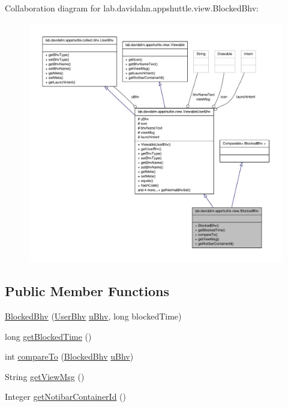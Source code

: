 \-Collaboration diagram for lab.\-davidahn.\-appshuttle.\-view.\-Blocked\-Bhv\-:
\nopagebreak
\begin{figure}[H]
\begin{center}
\leavevmode
\includegraphics[width=350pt]{classlab_1_1davidahn_1_1appshuttle_1_1view_1_1_blocked_bhv__coll__graph}
\end{center}
\end{figure}
\subsection*{\-Public \-Member \-Functions}
\begin{DoxyCompactItemize}
\item 
\hyperlink{classlab_1_1davidahn_1_1appshuttle_1_1view_1_1_blocked_bhv_a21ecdacd2cc6d1083c4d2a0d947bc168}{\-Blocked\-Bhv} (\hyperlink{interfacelab_1_1davidahn_1_1appshuttle_1_1collect_1_1bhv_1_1_user_bhv}{\-User\-Bhv} \hyperlink{classlab_1_1davidahn_1_1appshuttle_1_1view_1_1_viewable_user_bhv_a562684126a3e756e8ebe246c89699ba9}{u\-Bhv}, long blocked\-Time)
\item 
long \hyperlink{classlab_1_1davidahn_1_1appshuttle_1_1view_1_1_blocked_bhv_a5a9ea12146206e1c710c739fad13d0b4}{get\-Blocked\-Time} ()
\item 
int \hyperlink{classlab_1_1davidahn_1_1appshuttle_1_1view_1_1_blocked_bhv_ab536968dce0d07e05aeda0eb1b60dab4}{compare\-To} (\hyperlink{classlab_1_1davidahn_1_1appshuttle_1_1view_1_1_blocked_bhv}{\-Blocked\-Bhv} \hyperlink{classlab_1_1davidahn_1_1appshuttle_1_1view_1_1_viewable_user_bhv_a562684126a3e756e8ebe246c89699ba9}{u\-Bhv})
\item 
\-String \hyperlink{classlab_1_1davidahn_1_1appshuttle_1_1view_1_1_blocked_bhv_a0d026a69132e28284ed9282566236d03}{get\-View\-Msg} ()
\item 
\-Integer \hyperlink{classlab_1_1davidahn_1_1appshuttle_1_1view_1_1_blocked_bhv_af93e46e176446f7a1bbb6fdc1f867fb7}{get\-Notibar\-Container\-Id} ()
\end{DoxyCompactItemize}


